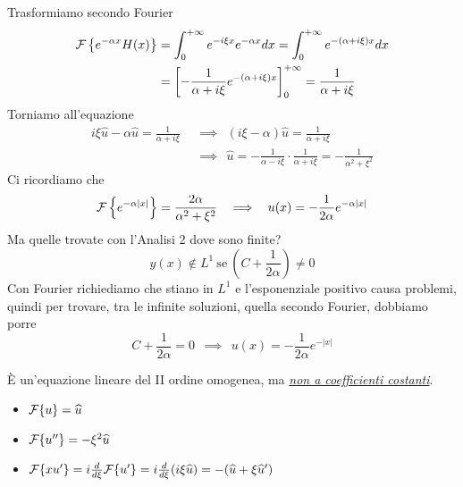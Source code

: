 Trasformiamo secondo Fourier
\begin{equation*}
\begin{aligned}
\mathcal{F} \left\{e^{- \alpha x} H(x)\right\} & = \int^{+ \infty}_{0} e^{- i\xi x} e^{- \alpha x} dx = \int^{+ \infty}_{0} e^{- (\alpha + i\xi) x} dx\\
 & = \left[ - \frac{1}{\alpha + i\xi} e^{- (\alpha + i\xi) x}\right]^{+ \infty}_{0} = \frac{1}{\alpha + i\xi}
\end{aligned}
\end{equation*}
Torniamo all'equazione
\begin{equation*}
\begin{aligned}
i\xi \hat{u} - \alpha \hat{u} = \frac{1}{\alpha + i\xi} \ \ & \implies \ \ (i\xi - \alpha)\hat{u} = \frac{1}{\alpha + i\xi}\\
 & \implies \ \ \hat{u} = - \frac{1}{\alpha - i\xi} \cdot \frac{1}{\alpha + i\xi} = - \frac{1}{\alpha^{2} + \xi^{2}}
\end{aligned}
\end{equation*}
Ci ricordiamo che
\begin{equation*}
\mathcal{F} \left\{e^{- \alpha | x|}\right\} = \frac{2\alpha}{\alpha^{2} + \xi^{2}} \ \ \implies \ \ u(x) = - \frac{1}{2\alpha} e^{- \alpha | x|}
\end{equation*}
Ma quelle trovate con l'Analisi 2 dove sono finite?
\begin{equation*}
y(x) \notin L^{1} \ \text{se} \ \left(C + \frac{1}{2\alpha}\right) \neq 0
\end{equation*}
Con Fourier richiediamo che stiano in $L^{1}$ e l'esponenziale positivo causa problemi, quindi per trovare, tra le infinite soluzioni, quella secondo Fourier, dobbiamo porre
\begin{equation*}
C + \frac{1}{2\alpha} = 0\ \ \implies \ \ u(x) = - \frac{1}{2\alpha} e^{- | x|}
\end{equation*}

\Soluzione

È un'equazione lineare del II ordine omogenea, ma \textit{\underline{non a coefficienti costanti}}.
\begin{itemize}
\item $\mathcal{F} \{u\} = \widehat{u}$
\item $\mathcal{F} \{u''\} = - \xi^{2}\widehat{u}$
\item $\mathcal{F} \{xu'\} = i\frac{d}{d\xi}\mathcal{F} \{u'\} = i\frac{d}{d\xi}(i\xi \widehat{u}) = - (\widehat{u} + \xi \widehat{u}')$
\end{itemize}

